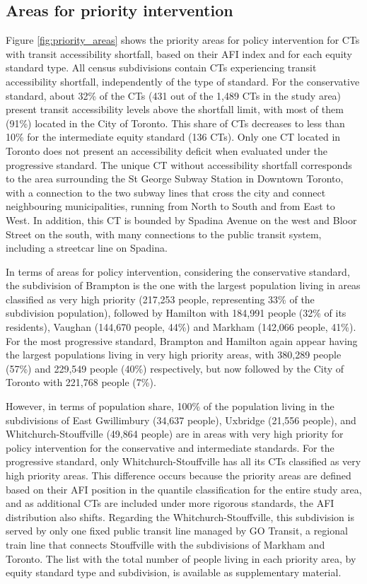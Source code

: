 \documentclass[preprint, 3p,
authoryear]{elsarticle} %
\begin{document}
\subsection{Areas for priority
intervention}\label{areas-for-priority-intervention-1}

Figure \ref{fig:priority_areas} shows the priority areas for policy
intervention for CTs with transit accessibility shortfall, based on
their AFI index and for each equity standard type. All census
subdivisions contain CTs experiencing transit accessibility shortfall,
independently of the type of standard. For the conservative standard,
about 32\% of the CTs (431 out of the 1,489 CTs in the study area)
present transit accessibility levels above the shortfall limit, with
most of them (91\%) located in the City of Toronto. This share of CTs
decreases to less than 10\% for the intermediate equity standard (136
CTs). Only one CT located in Toronto does not present an accessibility
deficit when evaluated under the progressive standard. The unique CT
without accessibility shortfall corresponds to the area surrounding the
St George Subway Station in Downtown Toronto, with a connection to the
two subway lines that cross the city and connect neighbouring
municipalities, running from North to South and from East to West. In
addition, this CT is bounded by Spadina Avenue on the west and Bloor
Street on the south, with many connections to the public transit system,
including a streetcar line on Spadina.

In terms of areas for policy intervention, considering the conservative
standard, the subdivision of Brampton is the one with the largest
population living in areas classified as very high priority (217,253
people, representing 33\% of the subdivision population), followed by
Hamilton with 184,991 people (32\% of its residents), Vaughan (144,670
people, 44\%) and Markham (142,066 people, 41\%). For the most
progressive standard, Brampton and Hamilton again appear having the
largest populations living in very high priority areas, with 380,289
people (57\%) and 229,549 people (40\%) respectively, but now followed
by the City of Toronto with 221,768 people (7\%).

However, in terms of population share, 100\% of the population living in
the subdivisions of East Gwillimbury (34,637 people), Uxbridge (21,556
people), and Whitchurch-Stouffville (49,864 people) are in areas with
very high priority for policy intervention for the conservative and
intermediate standards. For the progressive standard, only
Whitchurch-Stouffville has all its CTs classified as very high priority
areas. This difference occurs because the priority areas are defined
based on their AFI position in the quantile classification for the
entire study area, and as additional CTs are included under more
rigorous standards, the AFI distribution also shifts. Regarding the
Whitchurch-Stouffville, this subdivision is served by only one fixed
public transit line managed by GO Transit, a regional train line that
connects Stouffville with the subdivisions of Markham and Toronto. The
list with the total number of people living in each priority area, by
equity standard type and subdivision, is available as supplementary
material.
\end{document}
